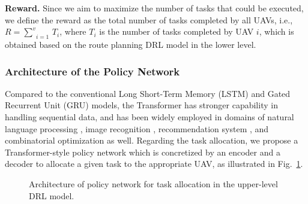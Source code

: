 \documentclass[lettersize,journal]{IEEEtran}
\begin{document}
	\textbf{Reward.} Since we aim to maximize the number of tasks that could be executed, we define the reward as the total number of tasks completed by all UAVs, i.e., $R=\underset{i=1}{\overset{v}{\mathop \sum }}\,{{T}_{i}}$, where ${{T}_{i}}$ is the number of tasks completed by UAV $i$, which is obtained based on the route planning DRL model in the lower level.
	
	
	\subsubsection{Architecture of the Policy Network}
	
	Compared to the conventional Long Short-Term Memory (LSTM) and Gated Recurrent Unit (GRU) models, the Transformer has stronger capability in handling sequential data, and has been widely employed in domains of natural language processing \cite{tetkoStateoftheartAugmentedNLP2020}, image recognition \cite{dosovitskiyImageWorth16x162020}, recommendation system \cite{sunBERT4RecSequentialRecommendation2019}, and combinatorial optimization \cite{xuReinforcementLearningMultiple2022} as well. Regarding the task allocation, we propose a Transformer-style policy network which is concretized by an encoder and a decoder to allocate a given task to the appropriate UAV, as illustrated in Fig.~\ref{Fig. 2}.
	
	\begin{figure}[htb]
		\caption{Architecture of policy network for task allocation in the upper-level DRL model.}
		\label{Fig. 2}
	\end{figure}
	
\end{document}
